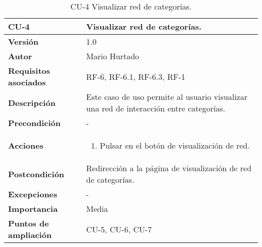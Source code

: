 \begin{table}[p]
	\centering
	\begin{tabularx}{\linewidth}{ p{} p{} }
			\toprule
			\textbf{CU-4}    & \textbf{Visualizar red de categorías.}\\
			\toprule
			\textbf{Versión}              & 1.0    \\
			\textbf{Autor}                & Mario Hurtado \\
			\textbf{Requisitos asociados} & RF-6, RF-6.1, RF-6.3, RF-1 \\
			\textbf{Descripción}          & Este caso de uso permite al usuario visualizar una red de interacción entre categorías. \\
			\textbf{Precondición}         &  - \\
			\textbf{Acciones}             &
			\begin{enumerate}
					\def\labelenumi{\arabic{enumi}.}
					\tightlist
					\item Pulsar en el botón de visualización de red.
				\end{enumerate}\\
			\textbf{Postcondición}        & Redirección a la página de visualización de red de categorías.\\
			\textbf{Excepciones}          &  - \\
			\textbf{Importancia}          & Media \\
			\textbf{Puntos de ampliación} & CU-5, CU-6, CU-7\\
			
			\bottomrule
		\end{tabularx}
	\caption{CU-4 Visualizar red de categorías.}
\end{table}
%
